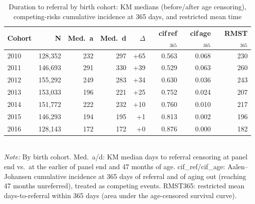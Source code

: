 \begin{table}[htbp]\centering
\caption{Duration to referral by birth cohort: KM medians (before/after age censoring), competing-risks cumulative incidence at 365 days, and restricted mean time}
\label{tab:C1f}
\footnotesize
\setlength{\tabcolsep}{4pt}
\begin{tabular}{lrrrrrrr}
\toprule
Cohort & N & Med.\ a & Med.\ d & $\Delta$ & cif\,ref$_{365}$ & cif\,age$_{365}$ & RMST$_{365}$ \\
\midrule
2010 & 128,352 & 232 & 297 & +65 & 0.563 & 0.068 & 230 \\
2011 & 146,693 & 291 & 330 & +39 & 0.529 & 0.063 & 260 \\
2012 & 155,292 & 249 & 283 & +34 & 0.630 & 0.036 & 243 \\
2013 & 153,033 & 196 & 221 & +25 & 0.752 & 0.024 & 207 \\
2014 & 151,772 & 222 & 232 & +10 & 0.760 & 0.010 & 217 \\
2015 & 146,293 & 194 & 195 & +1 & 0.813 & 0.002 & 196 \\
2016 & 128,143 & 172 & 172 & +0 & 0.876 & 0.000 & 182 \\
\bottomrule
\end{tabular}
\\[3pt]{\footnotesize \textit{Note:} By birth cohort. Med.\ a/d: KM median days to referral censoring at panel end vs.\ at the earlier of panel end and 47 months of age. cif\_ref/cif\_age: Aalen--Johansen cumulative incidence at 365 days of referral and of aging out (reaching 47 months unreferred), treated as competing events. RMST365: restricted mean days-to-referral within 365 days (area under the age-censored survival curve).}
\end{table}
